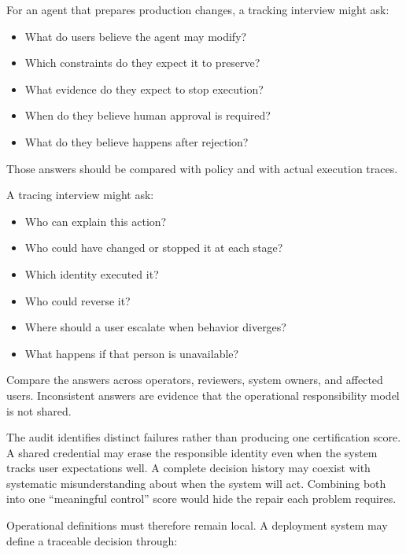 
For an agent that prepares production changes, a tracking interview might ask:

\begin{itemize}
\tightlist
\item
  What do users believe the agent may modify?
\item
  Which constraints do they expect it to preserve?
\item
  What evidence do they expect to stop execution?
\item
  When do they believe human approval is required?
\item
  What do they believe happens after rejection?
\end{itemize}

Those answers should be compared with policy and with actual execution traces.


A tracing interview might ask:

\begin{itemize}
\tightlist
\item
  Who can explain this action?
\item
  Who could have changed or stopped it at each stage?
\item
  Which identity executed it?
\item
  Who could reverse it?
\item
  Where should a user escalate when behavior diverges?
\item
  What happens if that person is unavailable?
\end{itemize}

Compare the answers across operators, reviewers, system owners, and affected users. Inconsistent answers are evidence that the operational responsibility model is not shared.

The audit identifies distinct failures rather than producing one certification score. A shared credential may erase the responsible identity even when the system tracks user expectations well. A complete decision history may coexist with systematic misunderstanding about when the system will act. Combining both into one ``meaningful control'' score would hide the repair each problem requires.


Operational definitions must therefore remain local. A deployment system may define a traceable decision through:

